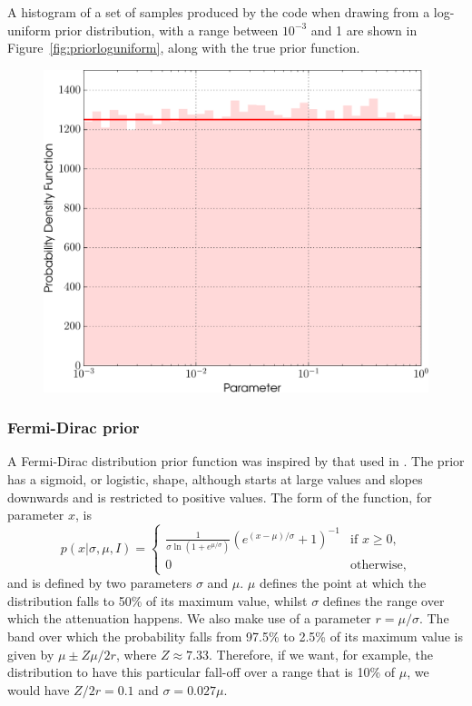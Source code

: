 A histogram of a set of samples produced by the code when drawing from a log-uniform prior distribution, with a range between
$10^{-3}$ and 1 are shown in Figure~\ref{fig:priorloguniform}, along with the true prior function.

\begin{figure}[!phtb]
\begin{center}
\includegraphics[width=1\columnwidth]{./figures/priors/loguniform/loguniform}
\caption{ \protect}
\end{center}
\end{figure}

\subsubsection{Fermi-Dirac prior}\label{sec:fdprior}

A Fermi-Dirac distribution prior function was inspired by that used in \citet{Middleton_2015}. The prior has a sigmoid, or logistic,
shape, although starts at large values and slopes downwards and is restricted to positive values. The form of the function, for
parameter $x$, is
\begin{equation}\label{eq:fermidirac}
 p(x|\sigma, \mu, I) = \begin{cases}\frac{1}{\sigma\ln{\left(1+e^{\mu/\sigma} \right)}}\left(e^{(x-\mu)/\sigma} + 1\right)^{-1} & \text{if } x \geqslant 0, \\
                        0 & \text{otherwise},
                       \end{cases}
\end{equation}
and is defined by two parameters $\sigma$ and $\mu$. $\mu$ defines the point at which the distribution falls to 50\% of
its maximum value, whilst $\sigma$ defines the range over which the attenuation happens. We also make use of a parameter
$r = \mu/\sigma$. The band over which the probability falls from 97.5\% to 2.5\% of its maximum value is given by $\mu \pm Z\mu/2r$, where
$Z\approx7.33$. Therefore, if we want, for example, the distribution to have this particular fall-off over a range that is 10\% of $\mu$,
we would have $Z/2r = 0.1$ and $\sigma = 0.027\mu$.

